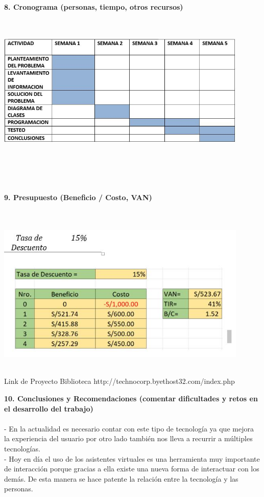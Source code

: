 \begin{flushleft}
\begin{itemize}
\textbf{ }\\
\textbf{8.      Cronograma (personas, tiempo, otros recursos) }\\
\textbf{ }\\

\textbf{ }\\
\begin{center}
	\includegraphics[width=12cm]{./Imagenes/bot1} 
	\end{center}
\textbf{ }\\
\textbf{ }\\
\textbf{ }\\
\textbf{ }\\
\textbf{9.      Presupuesto (Beneficio / Costo, VAN) }\\
\textbf{ }\\
\textbf{ }\\
\begin{center}
	\includegraphics[width=12cm]{./Imagenes/bot2} 
	\end{center}
\textbf{ }\\
Link de Proyecto Biblioteca
http://technocorp.byethost32.com/index.php

\textbf{10.  Conclusiones y Recomendaciones (comentar dificultades y retos en el desarrollo del trabajo)}\\
\textbf{ }\\
-	En la actualidad es necesario contar con este tipo de tecnología ya que mejora la experiencia del usuario por otro lado también nos lleva a recurrir a múltiples tecnologías.\textbf{ }\\
-	Hoy en día el uso de los asistentes virtuales es una herramienta muy importante de interacción porque gracias a ella existe una nueva forma de interactuar con los demás. De esta manera se hace patente la relación entre la tecnología y las personas.\textbf{ }\\


\end{itemize} 


\end{flushleft}
